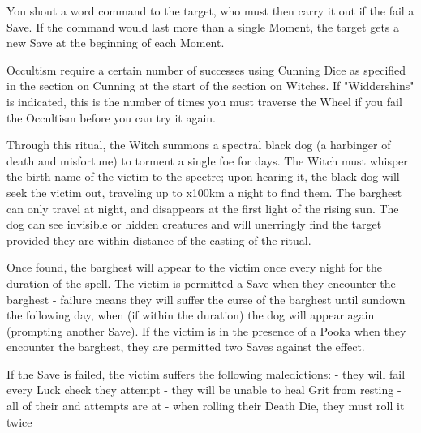 {\LITURGY [
  Name= Command,
  Link=miracle-command,
  Paradigm=Mind,
  Save=Y,
  Duration=0 ,
  Counter= n/a  ,
  Keywords=None ,
  Target=Nearby creature
]

You shout a \DICE word command to the target, who must then carry it out if the fail a Save.  If the command would last more than a single Moment, the target gets a new Save at the beginning of each Moment.






Occultism require a certain number of successes using Cunning Dice as specified in the section on Cunning at the start of the section on Witches.  If "Widdershins" is indicated, this is the number of times you must traverse the Wheel if you fail the Occultism before you can try it again.

\OCCULT[
  Name=Barghest,
  Link=occultism-barghest,
  Success=4,
  Cost=See below,
  Widdershins=1
]

Through this ritual, the Witch summons a spectral black dog (a harbinger of death and misfortune) to torment a single foe for \LVL days.  The Witch must whisper the birth name of the victim to the spectre; upon hearing it, the black dog will seek the victim out, traveling up to \LVL x100km a night to find them.  The barghest can only travel at night, and disappears at the first light of the rising sun.  The dog can see invisible or hidden creatures and will unerringly find the target provided they are within distance of the casting of the ritual.

Once found, the barghest will appear to the victim once every night for the duration of the spell.  The victim is permitted a Save when they encounter the barghest - failure means they will suffer the curse of the barghest until sundown the following day, when (if within the duration) the dog will appear again (prompting another Save).  If the victim is in the presence of a Pooka when they encounter the barghest, they are permitted two Saves against the effect.

If the Save is failed, the victim suffers the following maledictions:
- they will fail every Luck check they attempt
- they will be unable to heal Grit from resting
- all of their \RO and \RB attempts are at \DCDOWN
- when rolling their Death Die, they must roll it twice

}
